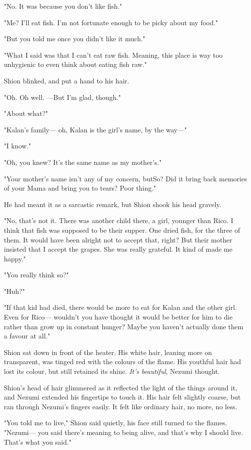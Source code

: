 "No. It was because you don't like fish."

"Me? I'll eat fish. I'm not fortunate enough to be picky about my food."

"But you told me once you didn't like it much."

"What I said was that I can't eat raw fish. Meaning, this place is way
too unhygienic to even think about eating fish raw."

Shion blinked, and put a hand to his hair.

"Oh. Oh well. ---But I'm glad, though."

"About what?"

"Kalan's family--- oh, Kalan is the girl's name, by the way---"

"I know."

"Oh, you knew? It's the same name as my mother's."

"Your mother's name isn't any of my concern, but\el So? Did it bring
back memories of your Mama and bring you to tears? Poor thing."

He had meant it as a sarcastic remark, but Shion shook his head gravely.

"No, that's not it. There was another child there, a girl, younger than
Rico. I think that fish was supposed to be their supper. One dried fish,
for the three of them. It would have been alright not to accept that,
right? But their mother insisted that I accept the grapes. She was
really grateful. It kind of made me happy."

"You really think so?"

"Huh?"

"If that kid had died, there would be more to eat for Kalan and the
other girl. Even for Rico--- wouldn't you have thought it would be better
for him to die rather than grow up in constant hunger? Maybe you haven't
actually done them a favour at all."

Shion sat down in front of the heater. His white hair, leaning more on
transparent, was tinged red with the colours of the flame. His youthful
hair had lost its colour, but still retained its shine. \emph{It's beautiful},
Nezumi thought.

Shion's head of hair glimmered as it reflected the light of the things
around it, and Nezumi extended his fingertips to touch it. His hair felt
slightly coarse, but ran through Nezumi's fingers easily. It felt like
ordinary hair, no more, no less.

"You told me to live," Shion said quietly, his face still turned to the
flames. "Nezumi--- you said there's meaning to being alive, and that's why
I should live. That's what you said."

